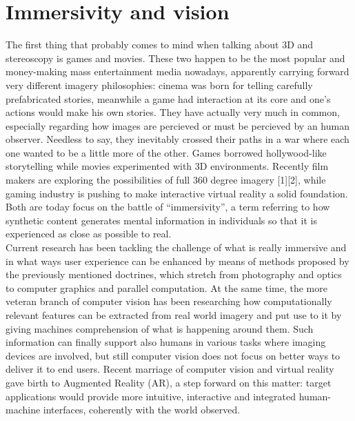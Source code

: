 \section{Immersivity and vision}
The first thing that probably comes to mind when talking about 3D and stereoscopy is games and movies. These two happen to be the most popular and money-making mass entertainment media nowadays, apparently carrying forward very different imagery philosophies: cinema was born for telling carefully prefabricated stories, meanwhile a game had interaction at its core and one’s actions would make his own stories. They have actually very much in common, especially regarding how images are percieved or must be percieved by an human observer. Needless to say, they inevitably crossed their paths in a war where each one wanted to be a little more of the other. Games borrowed hollywood-like storytelling while movies experimented with 3D environments. Recently film makers are exploring the possibilities of full 360 degree imagery [1][2], while gaming industry is pushing to make interactive virtual reality a solid foundation. Both are today focus on the battle of “immersivity”, a term referring to how synthetic content generates mental information in individuals so that it is experienced as close as possible to real.\\
Current research has been tackling the challenge of what is really immersive and in what ways user experience can be enhanced by means of methods proposed by the previously mentioned doctrines, which stretch from photography and optics to computer graphics and parallel computation. At the same time, the more veteran branch of computer vision has been researching how computationally relevant features can be extracted from real world imagery and put use to it by giving machines comprehension of what is happening around them. Such information can finally support also humans in various tasks where imaging devices are involved, but still computer vision does not focus on better ways to deliver it to end users. Recent marriage of computer vision and virtual reality gave birth to Augmented Reality (AR), a step forward on this matter: target applications would provide more intuitive, interactive and integrated human-machine interfaces, coherently with the world observed.\\
